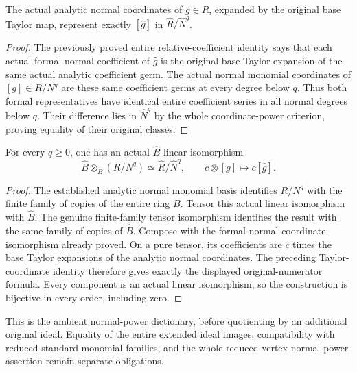 \begin{theorem}
\label{hir:actual-formal-normal-truncation-taylor}
\leanok
{}
The actual analytic normal coordinates of $g\in R$, expanded by the
original base Taylor map, represent exactly $[\widehat g]$ in
$\widehat R/\widehat N^q$.
\end{theorem}
\begin{proof}
The previously proved entire relative-coefficient identity says that
each actual formal normal coefficient of $\widehat g$ is the original
base Taylor expansion of the same actual analytic coefficient germ.
The actual normal monomial coordinates of $[g]\in R/N^q$ are these
same coefficient germs at every degree below $q$. Thus both formal
representatives have identical entire coefficient series in all normal
degrees below $q$. Their difference lies in $\widehat N^q$ by the whole
coordinate-power criterion, proving equality of their original classes.
\end{proof}

\begin{theorem}
\label{hir:actual-formal-normal-truncation-base-change}
\leanok
{}
For every $q\geq0$, one has an actual $\widehat B$-linear isomorphism
\[
 \widehat B\otimes_B(R/N^q)\simeq\widehat R/\widehat N^q,
 \qquad c\otimes[g]\longmapsto c[\widehat g].
\]
\end{theorem}
\begin{proof}
The established analytic normal monomial basis identifies $R/N^q$ with
the finite family of copies of the entire ring $B$. Tensor this actual
linear isomorphism with $\widehat B$. The genuine finite-family tensor
isomorphism identifies the result with the same family of copies of
$\widehat B$. Compose with the formal normal-coordinate isomorphism
already proved. On a pure tensor, its coefficients are $c$ times the
base Taylor expansions of the analytic normal coordinates. The preceding
Taylor-coordinate identity therefore gives exactly the displayed
original-numerator formula. Every component is an actual linear
isomorphism, so the construction is bijective in every order, including zero.
\end{proof}

This is the ambient normal-power dictionary, before quotienting by an
additional original ideal. Equality of the entire extended ideal images,
compatibility with reduced standard monomial families, and the whole
reduced-vertex normal-power assertion remain separate obligations.
